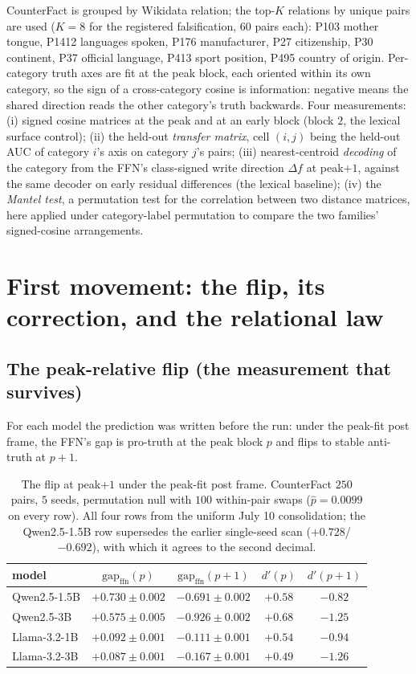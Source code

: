 \documentclass[11pt]{article}
\begin{document}
CounterFact is grouped by Wikidata relation; the top-$K$ relations by
unique pairs are used ($K{=}8$ for the registered falsification, $60$ pairs
each): P103 mother tongue, P1412 languages spoken, P176 manufacturer, P27
citizenship, P30 continent, P37 official language, P413 sport position,
P495 country of origin. Per-category truth axes are fit at the peak block,
each oriented within its own category, so the sign of a cross-category
cosine is information: negative means the shared direction reads the other
category's truth backwards. Four measurements: (i) signed cosine matrices
at the peak and at an early block (block $2$, the lexical surface control);
(ii) the held-out \emph{transfer matrix}, cell $(i,j)$ being the held-out
AUC of category $i$'s axis on category $j$'s pairs; (iii) nearest-centroid
\emph{decoding} of the category from the FFN's class-signed write direction
$\Delta f$ at peak$+1$, against the same decoder on early residual
differences (the lexical baseline); (iv) the \emph{Mantel test}, a
permutation test for the correlation between two distance matrices, here
applied under category-label permutation to compare the two families'
signed-cosine arrangements.

\section{First movement: the flip, its correction, and the relational law}
\label{b:sec:flip}

\subsection{The peak-relative flip (the measurement that survives)}

For each model the prediction was written before the run: under the
peak-fit post frame, the FFN's gap is pro-truth at the peak block $p$ and
flips to stable anti-truth at $p{+}1$.

\begin{table}[H]
\centering
\caption{The flip at peak$+1$ under the peak-fit post frame. CounterFact
$250$ pairs, $5$ seeds, permutation null with $100$ within-pair swaps
($\hat p = 0.0099$ on every row). All four rows from the uniform July 10
consolidation; the Qwen2.5-1.5B row supersedes the earlier single-seed scan
($+0.728$/$-0.692$), with which it agrees to the second decimal.}
\label{b:tab:flip}
\begin{tabular}{lcccc}
\toprule
model & $\mathrm{gap}_{\mathrm{ffn}}(p)$ & $\mathrm{gap}_{\mathrm{ffn}}(p{+}1)$ & $d'(p)$ & $d'(p{+}1)$ \\
\midrule
Qwen2.5-1.5B & $+0.730 \pm 0.002$ & $-0.691 \pm 0.002$ & $+0.58$ & $-0.82$ \\
Qwen2.5-3B   & $+0.575 \pm 0.005$ & $-0.926 \pm 0.002$ & $+0.68$ & $-1.25$ \\
Llama-3.2-1B & $+0.092 \pm 0.001$ & $-0.111 \pm 0.001$ & $+0.54$ & $-0.94$ \\
Llama-3.2-3B & $+0.087 \pm 0.001$ & $-0.167 \pm 0.001$ & $+0.49$ & $-1.26$ \\
\bottomrule
\end{tabular}
\end{table}
\end{document}
